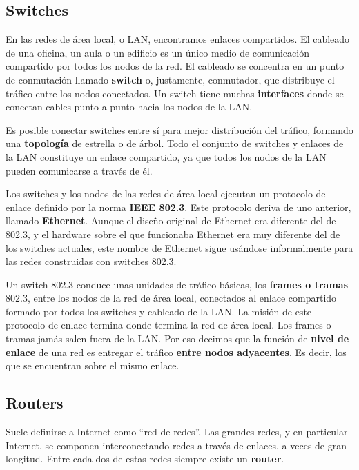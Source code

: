 \documentclass[spanish,a4paper,]{article}
\begin{document}
\hypertarget{switches}{%
\subsection{Switches}\label{switches}}

En las redes de área local, o LAN, encontramos enlaces compartidos. El
cableado de una oficina, un aula o un edificio es un único medio de
comunicación compartido por todos los nodos de la red. El cableado se
concentra en un punto de conmutación llamado \textbf{switch} o,
justamente, conmutador, que distribuye el tráfico entre los nodos
conectados. Un switch tiene muchas \textbf{interfaces} donde se conectan
cables punto a punto hacia los nodos de la LAN.

Es posible conectar switches entre sí para mejor distribución del
tráfico, formando una \textbf{topología} de estrella o de árbol. Todo el
conjunto de switches y enlaces de la LAN constituye un enlace
compartido, ya que todos los nodos de la LAN pueden comunicarse a través
de él.

Los switches y los nodos de las redes de área local ejecutan un
protocolo de enlace definido por la norma \textbf{IEEE 802.3}. Este
protocolo deriva de uno anterior, llamado \textbf{Ethernet}. Aunque el
diseño original de Ethernet era diferente del de 802.3, y el hardware
sobre el que funcionaba Ethernet era muy diferente del de los switches
actuales, este nombre de Ethernet sigue usándose informalmente para las
redes construidas con switches 802.3.

Un switch 802.3 conduce unas unidades de tráfico básicas, los
\textbf{frames o tramas} 802.3, entre los nodos de la red de área local,
conectados al enlace compartido formado por todos los switches y
cableado de la LAN. La misión de este protocolo de enlace termina donde
termina la red de área local. Los frames o tramas jamás salen fuera de
la LAN. Por eso decimos que la función de \textbf{nivel de enlace} de
una red es entregar el tráfico \textbf{entre nodos adyacentes}. Es
decir, los que se encuentran sobre el mismo enlace.

\hypertarget{routers}{%
\subsection{Routers}\label{routers}}

Suele definirse a Internet como ``red de redes''. Las grandes redes, y
en particular Internet, se componen interconectando redes a través de
enlaces, a veces de gran longitud. Entre cada dos de estas redes siempre
existe un \textbf{router}.
\end{document}
